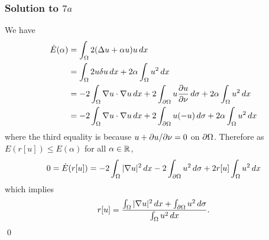 \subsubsection*{Solution to $7a$}
We have
\begin{align*}
\dot{E}(\alpha) &= \int_{\Omega}2(\Delta u + \alpha u)u\, dx\\
&= \int_{\Omega}2u\delta u\, dx + 2\alpha\int_{\Omega}u^{2}\, dx\\
&= -2\int_{\Omega}\nabla u\cdot \nabla u\, dx + 2 \int_{\partial\Omega}u\frac{\partial u}{\partial \nu}\, d\sigma + 2\alpha\int_{\Omega}u^{2}\, dx\\
&= -2\int_{\Omega}\nabla u \cdot \nabla u\, dx + 2 \int_{\partial\Omega}u(-u)\, d\sigma + 2\alpha\int_{\Omega}u^{2}\, dx
\end{align*}
where the third equality is because $u + \partial u/\partial \nu = 0$ on $\partial\Omega$. Therefore as $E(r[u]) \leq E(\alpha)$ for all $\alpha \in \mathbb{R}$,
\begin{align*}
0 = \dot{E}(r[u]) = -2\int_{\Omega}|\nabla u|^{2}\, dx - 2\int_{\partial\Omega}u^{2}\, d\sigma + 2r[u]\int_{\Omega}u^{2}\, dx
\end{align*}
which implies
$$r[u] = \frac{\int_{\Omega}|\nabla u|^{2}\, dx + \int_{\partial\Omega}u^{2}\, d\sigma}{\int_{\Omega}u^{2}\, dx}.$$
\hfill\qed

